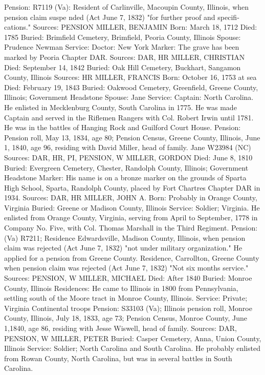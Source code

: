 Pension: R7119 (Va): Resident of Carlinville, Macoupin County, Illinois, when pension claim suspe nded (Act June 7, 1832) "for further proof and specifi­cations."
Sources: PENSION 
MILLER, BENJAMIN
Born: March 18, 1712
Died: 1785
Buried: Brimfield Cemetery, Brimfield, Peoria County, Illinois
Spouse: Prudence Newman
Service: Doctor: New York
Marker: The grave has been marked by Peoria Chapter DAR.
Sources: DAR, HR 
MILLER, CHRISTIAN 
Died: September 14, 1842 
Buried: Oak Hill Cemetery, Buckhart, Sangamon County, Illinois 
Sources: HR 
MILLER, FRANCIS
Born: October 16, 1753 at sea
Died: February 19, 1843
Buried: Oakwood Cemetery, Greenfield, Greene County, Illinois; Government Headstone
Spouse: Jane
Service: Captain: North Carolina. He enlisted in Mecklenburg County, South Carolina in 1775. He was made Captain and served in the Riflemen Rangers with Col. Robert Irwin until 1781. He was in the battles of Hanging Rock and Guilford Court House. 
Pension: Pension roll, May 13, 1834, age 80; Pension Census, Greene County, Illinois, June 1, 1840, age 96, residing with David Miller, head of family. Jane W23984 (NC) 
Sources: DAR, HR, PI, PENSION, W 
MILLER, GORDON
Died: June 8, 1810
Buried: Evergreen Cemetery, Chester, Randolph County, Illinois; Government Headstone
Marker: His name is on a bronze marker on the grounds of Sparta High School, Sparta, Randolph County, placed by Fort Chartres Chapter DAR in 1934.
Sources: DAR, HR 
MILLER, JOHN A. 
Born: Probably in Orange County, Virginia 
Buried: Greene or Madison County, Illinois 
Service: Soldier; Virginia. He enlisted from Orange County, Virginia, serving from April to September, 1778 in Company No. Five, with Col. Thomas Marshall in the Third Regiment. 
Pension: (Va) R7211; Residence Edwardsville, Madison County, Illinois, when pension claim was rejected (Act June 7, 1832) "not under military organiza­tion." He applied for a pension from Greene County. Residence, Carrollton, Greene County when pension claim was rejected (Act June 7, 1832) "Not six months service." 
Sources: PENSION, W 
MILLER, MICHAEL
Died: After 1840
Buried: Monroe County, Illinois
Residences: He came to Illinois in 1800 from Pennsylvania, settling south of the Moore tract in Monroe County, Illinois. 
Service: Private; Virginia Continental troops 
Pension: S33103 (Va); Illinois pension roll, Monroe County, Illinois, July 18, 1833, age 73; Pension Census, Monroe County, June 1,1840, age 86, residing with Jesse Wiswell, head of family. 
Sources: DAR, PENSION, W 
MILLER, PETER 
Buried: Casper Cemetery, Anna, Union County, Illinois 
Service: Soldier; North Carolina and South Carolina. He probably enlisted from Rowan County, North Carolina, but was in several battles in South Carolina.
